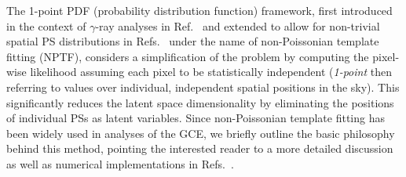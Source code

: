 \documentclass[prd,aps,10pt,nofootinbib,twocolumn,superscriptaddress,preprintnumbers,balancelastpage,longbibliography,floatfix]{revtex4-2}
\begin{document}
The 1-point PDF (probability distribution function) framework, first introduced in the context of $\gamma$-ray analyses in Ref.~\cite{Malyshev:2011zi} and extended to allow for non-trivial spatial PS distributions in Refs.~\cite{Lee:2014mza,Lee:2015fea} under the name of non-Poissonian template fitting (NPTF), considers a simplification of the problem by computing the pixel-wise likelihood assuming each pixel to be statistically independent (\emph{1-point} then referring to values over individual, independent spatial positions in the sky). This significantly reduces the latent space dimensionality by eliminating the positions of individual PSs as latent variables. Since non-Poissonian template fitting has been widely used in analyses of the GCE, we briefly outline the basic philosophy behind this method, pointing the interested reader to a more detailed discussion as well as numerical implementations in Refs.~\cite{Lee:2015fea,Mishra-Sharma:2016gis}.
\end{document}
